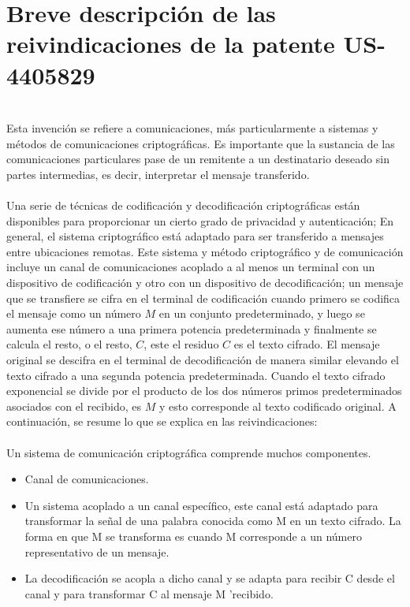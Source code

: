 \documentclass[12pt, a4paper]{article}
\begin{document}
	\section{Breve descripción de las reivindicaciones de la patente US-4405829}
	\\Esta invención se refiere a comunicaciones, más particularmente a sistemas y métodos de comunicaciones criptográficas. Es importante que la sustancia de las comunicaciones particulares pase de un remitente a un destinatario deseado sin partes intermedias, es decir, interpretar el mensaje transferido.
	\\
	\\Una serie de técnicas de codificación y decodificación criptográficas están disponibles para proporcionar un cierto grado de privacidad y autenticación; En general, el sistema criptográfico está adaptado para ser transferido a mensajes entre ubicaciones remotas. Este sistema y método criptográfico y de comunicación incluye un canal de comunicaciones acoplado a al menos un terminal con un dispositivo de codificación y otro con un dispositivo de decodificación; un mensaje que se transfiere se cifra en el terminal de codificación cuando primero se codifica el mensaje como un número $M$ en un conjunto predeterminado, y luego se aumenta ese número a una primera potencia predeterminada y finalmente se calcula el resto, o el resto, $C$, este el residuo $C$ es el texto cifrado. El mensaje original se descifra en el terminal de decodificación de manera similar elevando el texto cifrado a una segunda potencia predeterminada. Cuando el texto cifrado exponencial se divide por el producto de los dos números primos predeterminados asociados con el recibido, es $M$ y esto corresponde al texto codificado original. A continuación, se resume lo que se explica en las reivindicaciones:
	\\
	\\Un sistema de comunicación criptográfica comprende muchos componentes.
	\begin{itemize}
		\item Canal de comunicaciones.
		\item Un sistema acoplado a un canal específico, este canal está adaptado para transformar la señal de una palabra conocida como M en un texto cifrado. La forma en que M se transforma es cuando M corresponde a un número representativo de un mensaje.
		\item La decodificación se acopla a dicho canal y se adapta para recibir C desde el canal y para transformar C al mensaje M 'recibido.
	\end{itemize}
\end{document}
